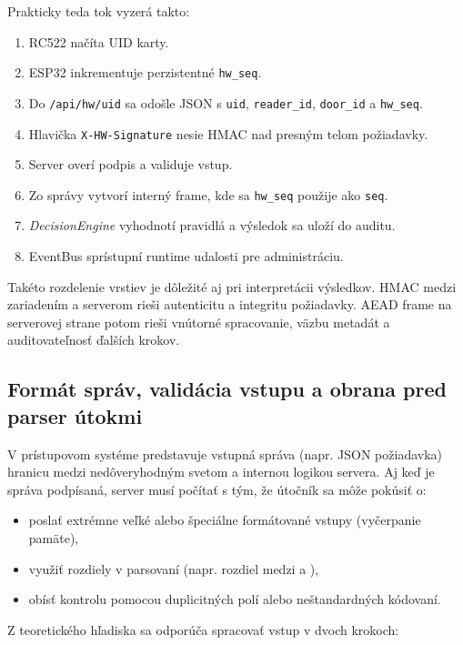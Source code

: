 \documentclass[journal,a4paper,onecolumn]{IEEEtran}
\begin{document}
Prakticky teda tok vyzerá takto:
\begin{enumerate}[leftmargin=*,itemsep=2pt]
  \item RC522 načíta UID karty.
  \item ESP32 inkrementuje perzistentné \texttt{hw\_seq}.
  \item Do \texttt{/api/hw/uid} sa odošle JSON s \texttt{uid}, \texttt{reader\_id}, \texttt{door\_id} a \texttt{hw\_seq}.
  \item Hlavička \texttt{X-HW-Signature} nesie HMAC nad presným telom požiadavky.
  \item Server overí podpis a validuje vstup.
  \item Zo správy vytvorí interný frame, kde sa \texttt{hw\_seq} použije ako \texttt{seq}.
  \item \emph{DecisionEngine} vyhodnotí pravidlá a výsledok sa uloží do auditu.
  \item EventBus sprístupní runtime udalosti pre administráciu.
\end{enumerate}

Takéto rozdelenie vrstiev je dôležité aj pri interpretácii výsledkov. HMAC medzi zariadením a serverom rieši autenticitu a integritu požiadavky. AEAD frame na serverovej strane potom rieši vnútorné spracovanie, väzbu metadát a auditovateľnosť ďalších krokov.

\subsection{Formát správ, validácia vstupu a obrana pred parser útokmi}

V prístupovom systéme predstavuje vstupná správa (napr. JSON požiadavka) hranicu medzi nedôveryhodným svetom a internou logikou servera. Aj keď je správa podpísaná, server musí počítať s tým, že útočník sa môže pokúsiť o:

\begin{itemize}[leftmargin=*,itemsep=2pt]
  \item poslať extrémne veľké alebo špeciálne formátované vstupy (vyčerpanie pamäte),
  \item využiť rozdiely v parsovaní (napr. rozdiel medzi  a ),
  \item obísť kontrolu pomocou duplicitných polí alebo neštandardných kódovaní.
\end{itemize}

Z teoretického hľadiska sa odporúča spracovať vstup v dvoch krokoch:
\end{document}
